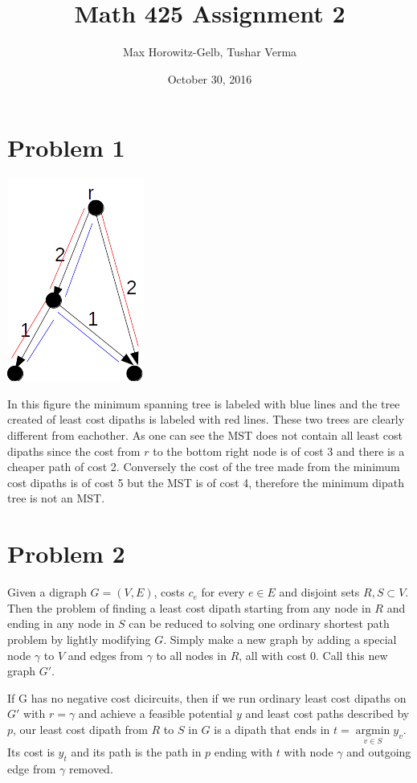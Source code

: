 \documentclass{article}
\title{Math 425 Assignment 2}
\author{Max Horowitz-Gelb, Tushar Verma}
\date{October 30, 2016}
\DeclareMathOperator*{\argmin}{argmin}
\begin{document}
\maketitle
\section*{Problem 1}
\includegraphics[scale=0.5]{tree}

In this figure the minimum spanning tree is labeled with blue lines and the tree created of least cost dipaths is labeled with red lines. These two trees are clearly different from eachother. As one can see the MST does not contain all least cost dipaths since the cost from $r$ to the bottom right node is of cost 3 and there is a cheaper path of cost 2. Conversely the cost of the tree made from the minimum cost dipaths is of cost 5 but the MST is of cost 4, therefore the minimum dipath tree is not an MST.
\section*{Problem 2}
Given a digraph $G = (V,E)$, costs $c_e$ for every $e \in E$ and disjoint sets $R,S \subset V$. Then the problem of finding a least cost dipath starting from any node in $R$ and ending in any node in $S$ can be reduced to solving one ordinary shortest path problem by lightly modifying $G$. Simply make a new graph by adding a special node $\gamma$ to $V$ and edges from $\gamma$ to all nodes in $R$, all with cost $0$. Call this new graph  $G'$.

If G has no negative cost dicircuits, then if we run ordinary least cost dipaths on $G'$ with $r = \gamma$ and achieve a feasible potential $y$ and least cost paths
described by 
$p$, our least cost dipath from $R$ to $S$ in $G$ is a dipath that ends in $t = \argmin\limits_{v \in S} y_v$. Its cost is $y_t$ and its path is the path in $p$ ending with $t$ with node $\gamma$ and outgoing edge from $\gamma$ removed.
\end{document}
